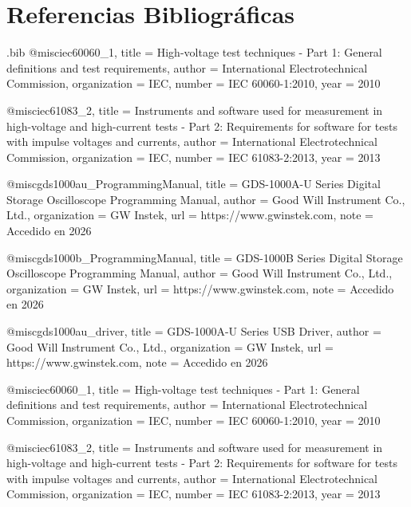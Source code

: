 \newpage
\section*{Referencias Bibliográficas}

\begin{filecontents*}{\jobname.bib}
@misc{iec60060_1,
  title        = {High-voltage test techniques - Part 1: General definitions and test requirements},
  author       = {{International Electrotechnical Commission}},
  organization = {IEC},
  number       = {IEC 60060-1:2010},
  year         = {2010}
}

@misc{iec61083_2,
  title        = {Instruments and software used for measurement in high-voltage and high-current tests - Part 2: Requirements for software for tests with impulse voltages and currents},
  author       = {{International Electrotechnical Commission}},
  organization = {IEC},
  number       = {IEC 61083-2:2013},
  year         = {2013}
}

@misc{gds1000au_ProgrammingManual,
  title        = {GDS-1000A-U Series Digital Storage Oscilloscope Programming Manual},
  author       = {{Good Will Instrument Co., Ltd.}},
  organization = {GW Instek},
  url          = {https://www.gwinstek.com},
  note         = {Accedido en 2026}
}

@misc{gds1000b_ProgrammingManual,
  title        = {GDS-1000B Series Digital Storage Oscilloscope Programming Manual},
  author       = {{Good Will Instrument Co., Ltd.}},
  organization = {GW Instek},
  url          = {https://www.gwinstek.com},
  note         = {Accedido en 2026}
}

@misc{gds1000au_driver,
  title        = {GDS-1000A-U Series USB Driver},
  author       = {{Good Will Instrument Co., Ltd.}},
  organization = {GW Instek},
  url          = {https://www.gwinstek.com},
  note         = {Accedido en 2026}
}
\end{filecontents*}

@misc{iec60060_1,
  title        = {High-voltage test techniques - Part 1: General definitions and test requirements},
  author       = {{International Electrotechnical Commission}},
  organization = {IEC},
  number       = {IEC 60060-1:2010},
  year         = {2010}
}

@misc{iec61083_2,
  title        = {Instruments and software used for measurement in high-voltage and high-current tests - Part 2: Requirements for software for tests with impulse voltages and currents},
  author       = {{International Electrotechnical Commission}},
  organization = {IEC},
  number       = {IEC 61083-2:2013},
  year         = {2013}
}

